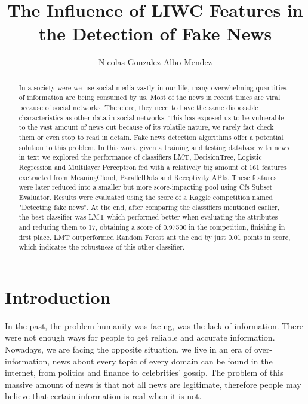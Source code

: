 \documentclass[runningheads]{llncs}
\begin{document}
%
\title{The Influence of LIWC Features in the Detection of Fake News}
%
%
\author{Nicolas Gonzalez Albo Mendez
%
%
}

%
\maketitle              %
%
\begin{abstract}
In a society were we use social media vastly in our life, many overwhelming quantities of information are being consumed by us. Most of the news in recent times are viral because of social networks. Therefore, they need to have the same disposable characteristics as other data in social networks. This has exposed us to be vulnerable to the vast amount of news out because of its volatile nature, we rarely fact check them or even stop to read in detain. Fake news detection algorithms offer a potential solution to this problem. In this work, given a training and testing database with news in text we explored the performance of classifiers LMT, DecisionTree, Logistic Regression and Multilayer Perceptron fed with a relatively big amount of 161 features exctracted from MeaningCloud, ParallelDots and Receptivity APIs. These features were later reduced into a smaller but more score-impacting pool using Cfs Subset Evaluator. Results were evaluated using the score of a Kaggle competition named "Detecting fake news". At the end, after comparing the classifiers mentioned earlier, the best classifier was LMT which performed better when evaluating the attributes and reducing them to 17, obtaining a score of 0.97500 in the competition, finishing in first place. LMT outperformed Random Forest ant the end by just 0.01 points in score, which indicates the robustness of this other classifier.

\end{abstract}
%
%
%
\section{Introduction}
In the past, the problem humanity was facing, was the lack of information. There were not enough ways for people to get reliable and accurate information. Nowadays, we are facing the opposite situation, we live in an era of over-information, news about every topic of every domain can be found in the internet, from politics and finance to celebrities' gossip. The problem of this massive amount of news is that not all news are legitimate, therefore people may believe that certain information is real when it is not.
\end{document}
